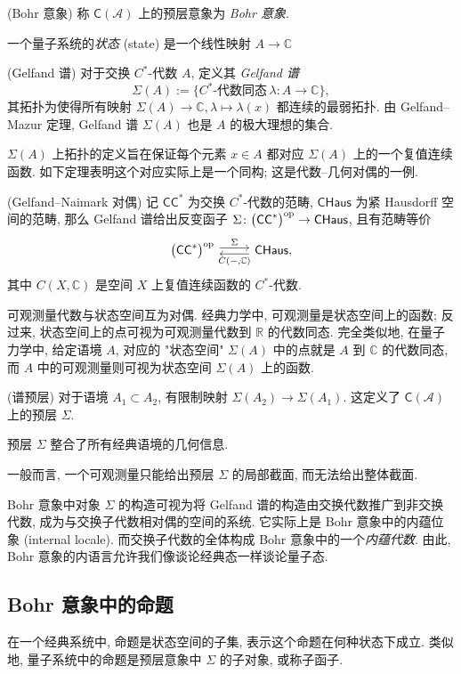 \begin{definition}
    {(Bohr 意象)}
    称 $\mathsf C(\mathcal A)$ 上的预层意象为 \emph{Bohr 意象}.
\end{definition}

一个量子系统的\emph{状态} (state) 是一个线性映射 $A \to \mathbb{C}$

\begin{definition}
    {(Gelfand 谱)}
    对于交换 $C^*$-代数 $A$, 定义其 \emph{Gelfand 谱}
$$
\Sigma(A) := \{C^*\text{-代数同态}\,\lambda\colon A \to\mathbb{C}\},
$$
其拓扑为使得所有映射 $\Sigma(A)\to\mathbb{C}, \lambda \mapsto \lambda (x)$ 都连续的最弱拓扑. 由 Gelfand--Mazur 定理, Gelfand 谱 $\Sigma(A)$ 也是 $A$ 的极大理想的集合.
\end{definition}

$\Sigma(A)$ 上拓扑的定义旨在保证每个元素 $x\in A$ 都对应 $\Sigma(A)$ 上的一个复值连续函数. 如下定理表明这个对应实际上是一个同构; 这是代数--几何对偶的一例.

\begin{prop}
    {(Gelfand--Naimark 对偶)}
    记 $\mathsf {CC}^*$ 为交换 $C^*$-代数的范畴, $\mathsf{CHaus}$ 为紧 Hausdorff 空间的范畴,
    那么 Gelfand 谱给出反变函子 $\Sigma\colon \big(\mathsf {CC}^*\big)^{\text{op}} \to \mathsf {CHaus}$, 且有范畴等价
    \[\begin{tikzcd}[ampersand replacement=\&]
    	{\big(\mathsf {CC}^*\big)^{\op}} \& {\mathsf {CHaus},}
    	\arrow["\Sigma", shift left, from=1-1, to=1-2]
    	\arrow["{C({-},\mathbb{C})}", shift left, from=1-2, to=1-1]
    \end{tikzcd}\]
    其中 $C(X,\mathbb{C})$ 是空间 $X$ 上复值连续函数的 $C^*$-代数.
\end{prop}

可观测量代数与状态空间互为对偶. 经典力学中, 可观测量是状态空间上的函数; 反过来, 状态空间上的点可视为可观测量代数到 $\mathbb{R}$ 的代数同态.
完全类似地, 在量子力学中, 给定语境 $A$, 对应的 "状态空间" $\Sigma(A)$ 中的点就是 $A$ 到 $\mathbb{C}$ 的代数同态, 而 $A$ 中的可观测量则可视为状态空间 $\Sigma(A)$ 上的函数.

\begin{definition}
    {(谱预层)}
    对于语境 $A_1 \subset A_2$, 有限制映射 $\Sigma(A_2)\to\Sigma(A_1)$. 这定义了 $\mathsf C(\mathcal A)$ 上的预层 $\Sigma$.
\end{definition}

\begin{remark}
    {}
    预层 $\Sigma$ 整合了所有经典语境的几何信息.
    
    一般而言, 一个可观测量只能给出预层 $\Sigma$ 的局部截面, 而无法给出整体截面.
\end{remark}

Bohr 意象中对象 $\Sigma$ 的构造可视为将 Gelfand 谱的构造由交换代数推广到非交换代数, 成为与交换子代数相对偶的空间的系统. 它实际上是 Bohr 意象中的内蕴位象 (internal locale). 而交换子代数的全体构成 Bohr 意象中的一个\emph{内蕴代数}. 由此, Bohr 意象的内语言允许我们像谈论经典态一样谈论量子态.

\subsection{Bohr 意象中的命题}



在一个经典系统中, 命题是状态空间的子集, 表示这个命题在何种状态下成立.
类似地, 量子系统中的命题是预层意象中 $\Sigma$ 的子对象, 或称子函子.